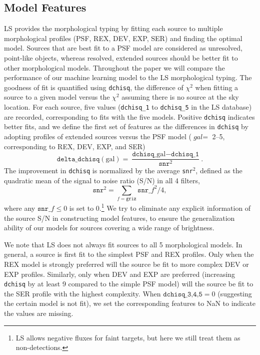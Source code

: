 \documentclass[twocolumn,tighten]{aastex631}
\begin{document}
\begin{CJK*}{UTF8}{gbsn}
\section{Model Features}\label{sec:features}
LS provides the morphological typing by fitting each source to multiple morphological profiles (PSF, REX, DEV, EXP, SER) and finding the optimal model. Sources that are best fit to a PSF model are considered as unresolved, point-like objects, whereas resolved, extended sources should be better fit to other morphological models. Throughout the paper we will compare the performance of our machine learning model to the LS morphological typing. 
The goodness of fit is quantified using \texttt{dchisq}, the difference of $\chi^2$ when fitting a source to a given model versus the $\chi^2$ assuming there is no source at the sky location. For each source, five values (\texttt{dchisq\_1} to \texttt{dchisq\_5} in the LS database) are recorded, corresponding to fits with the five models. Positive \texttt{dchisq} indicates better fits, and we define the first set of features as the differences in {\tt dchisq} by adopting profiles of extended sources versus the PSF model ($\textit{gal}=$ 2--5, corresponding to REX, DEV, EXP, and SER)
\begin{equation}\label{eq:feat_dchisq}
    \texttt{delta\_dchisq}(\text{gal}) = \frac{\texttt{dchisq\_}{\text{gal}} - \texttt{dchisq\_1}}{\texttt{snr}^2}.
\end{equation}
The improvement in {\tt dchisq} is normalized by the average \texttt{snr}$^2$, defined as the quadratic mean of the signal to noise ratio (S/N) in all 4 filters,
\begin{equation}
    \texttt{snr}^2 = \sum_{f=\texttt{griz}} \texttt{snr\_}{f}^2/4,
\end{equation}
where any $\texttt{snr\_}f\le 0$ is set to 0.\footnote{LS allows negative fluxes for faint targets, but here we still treat them as non-detections.} We try to eliminate any explicit information of the source S/N in constructing model features, to ensure the generalization ability of our models for sources covering a wide range of brightness. 

We note that LS does not always fit sources to all 5 morphological models. In general, a source is first fit to the simplest PSF and REX profiles. Only when the REX model is strongly preferred will the source be fit to more complex DEV or EXP profiles. Similarly, only when DEV and EXP are preferred (increasing \texttt{dchisq} by at least 9 compared to the simple PSF model) will the source be fit to the SER profile with the highest complexity. When $\texttt{dchisq\_3,4,5}=0$ (suggesting the certain model is not fit), we set the corresponding features to NaN to indicate the values are missing.


\end{CJK*}
\end{document}
